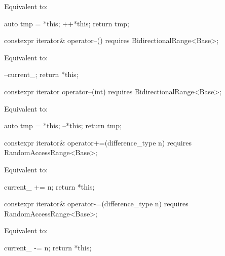 \begin{itemdescr}
\pnum
\effects Equivalent to:
\begin{codeblock}
auto tmp = *this;
++*this;
return tmp;
\end{codeblock}
\end{itemdescr}

\begin{itemdecl}
constexpr iterator& operator--() requires BidirectionalRange<Base>;
\end{itemdecl}

\begin{itemdescr}
\pnum
\effects Equivalent to:
\begin{codeblock}
--current_;
return *this;
\end{codeblock}
\end{itemdescr}

\begin{itemdecl}
constexpr iterator operator--(int) requires BidirectionalRange<Base>;
\end{itemdecl}

\begin{itemdescr}
\pnum
\effects Equivalent to:
\begin{codeblock}
auto tmp = *this;
--*this;
return tmp;
\end{codeblock}
\end{itemdescr}

\begin{itemdecl}
constexpr iterator& operator+=(difference_type n)
  requires RandomAccessRange<Base>;
\end{itemdecl}

\begin{itemdescr}
\pnum
\effects Equivalent to:
\begin{codeblock}
current_ += n;
return *this;
\end{codeblock}
\end{itemdescr}

%
\begin{itemdecl}
constexpr iterator& operator-=(difference_type n)
  requires RandomAccessRange<Base>;
\end{itemdecl}

\begin{itemdescr}
\pnum
\effects Equivalent to:
\begin{codeblock}
current_ -= n;
return *this;
\end{codeblock}
\end{itemdescr}

